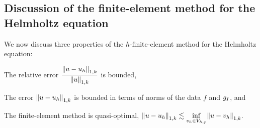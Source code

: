 


\subsection{Discussion of the finite-element method for the Helmholtz equation}\label{sec:helmfedisc}

We now discuss three properties of the $h$-finite-element method for the Helmholtz equation:
\bit
\item The relative error $\displaystyle \frac{\NW{u-\uh}}{\NW{u}}$ is bounded,
\item The error $\NW{u-\uh}$ is bounded in terms of norms of the data $f$ and $g_{I}$, and
  \item The finite-element method is quasi-optimal, $\displaystyle \NW{u-\uh} \lesssim \inf_{\vh \in \Vhp} \NW{u-\vh}.$
    \eit

